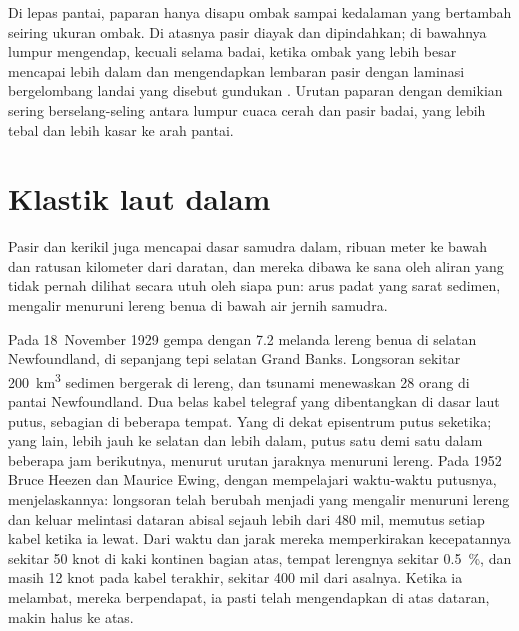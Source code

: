 Di lepas pantai, paparan hanya disapu ombak sampai kedalaman yang bertambah seiring ukuran ombak. Di atasnya pasir diayak dan dipindahkan; di bawahnya lumpur mengendap, kecuali selama badai, ketika ombak yang lebih besar mencapai lebih dalam dan mengendapkan lembaran pasir dengan laminasi bergelombang landai yang disebut  gundukan . Urutan paparan dengan demikian sering berselang-seling antara lumpur cuaca cerah dan pasir badai, yang lebih tebal dan lebih kasar ke arah pantai.

\section{Klastik laut dalam}\label{sec:b1:clastic-sediments:deep-sea}

Pasir dan kerikil juga mencapai dasar samudra dalam, ribuan meter ke bawah dan ratusan kilometer dari daratan, dan mereka dibawa ke sana oleh aliran yang tidak pernah dilihat secara utuh oleh siapa pun: arus padat yang sarat sedimen, mengalir menuruni lereng benua di bawah air jernih samudra.

\begin{history}
Pada 18~November 1929 gempa dengan  7.2 melanda lereng benua di selatan Newfoundland, di sepanjang tepi selatan Grand Banks. Longsoran sekitar \qty{200}{km^3} sedimen bergerak di lereng, dan tsunami menewaskan 28 orang di pantai Newfoundland. Dua belas kabel telegraf yang dibentangkan di dasar laut putus, sebagian di beberapa tempat. Yang di dekat episentrum putus seketika; yang lain, lebih jauh ke selatan dan lebih dalam, putus satu demi satu dalam beberapa jam berikutnya, menurut urutan jaraknya menuruni lereng. Pada 1952 Bruce Heezen dan Maurice Ewing, dengan mempelajari waktu-waktu putusnya, menjelaskannya: longsoran telah berubah menjadi  yang mengalir menuruni lereng dan keluar melintasi dataran abisal sejauh lebih dari 480 mil, memutus setiap kabel ketika ia lewat. Dari waktu dan jarak mereka memperkirakan kecepatannya sekitar 50 knot di kaki kontinen bagian atas, tempat lerengnya sekitar \qty{0.5}{\percent}, dan masih 12 knot pada kabel terakhir, sekitar 400 mil dari asalnya. Ketika ia melambat, mereka berpendapat, ia pasti telah mengendapkan  di atas dataran, makin halus ke atas.
\end{history}

